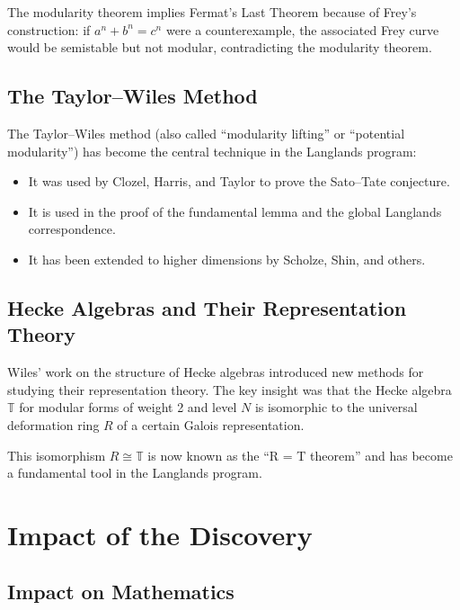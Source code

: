 The modularity theorem implies Fermat's Last Theorem because of Frey's construction: if $a^n + b^n = c^n$ were a counterexample, the associated Frey curve would be semistable but not modular, contradicting the modularity theorem.

\subsection{The Taylor--Wiles Method}

The Taylor--Wiles method (also called ``modularity lifting'' or ``potential modularity'') has become the central technique in the Langlands program:
\begin{itemize}
\item It was used by Clozel, Harris, and Taylor to prove the Sato--Tate conjecture.
\item It is used in the proof of the fundamental lemma and the global Langlands correspondence.
\item It has been extended to higher dimensions by Scholze, Shin, and others.
\end{itemize}

\subsection{Hecke Algebras and Their Representation Theory}

Wiles' work on the structure of Hecke algebras introduced new methods for studying their representation theory. The key insight was that the Hecke algebra $\mathbb{T}$ for modular forms of weight 2 and level $N$ is isomorphic to the universal deformation ring $R$ of a certain Galois representation.

This isomorphism $R \cong \mathbb{T}$ is now known as the ``R = T theorem'' and has become a fundamental tool in the Langlands program.

\section{Impact of the Discovery}

\subsection{Impact on Mathematics}

